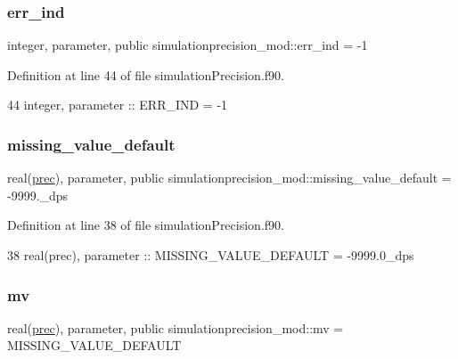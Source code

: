 \subsubsection{\texorpdfstring{err\+\_\+ind}{err\_ind}}
{\footnotesize\ttfamily integer, parameter, public simulationprecision\+\_\+mod\+::err\+\_\+ind = -\/1}



Definition at line 44 of file simulation\+Precision.\+f90.


\begin{DoxyCode}
44     \textcolor{keywordtype}{integer},  \textcolor{keywordtype}{parameter}   :: ERR\_IND  = -1
\end{DoxyCode}
\mbox{\label{namespacesimulationprecision__mod_a8fe62365170cdfed5a745be6d8e99e1c}} 
\subsubsection{\texorpdfstring{missing\+\_\+value\+\_\+default}{missing\_value\_default}}
{\footnotesize\ttfamily real(\mbox{\hyperlink{namespacesimulationprecision__mod_a361ca48174e0dc2228c07f25fa5396ec}{prec}}), parameter, public simulationprecision\+\_\+mod\+::missing\+\_\+value\+\_\+default = -\/9999.\+\_\+dps}



Definition at line 38 of file simulation\+Precision.\+f90.


\begin{DoxyCode}
38     \textcolor{keywordtype}{real(prec)}, \textcolor{keywordtype}{parameter} :: MISSING\_VALUE\_DEFAULT = -9999.0\_dps
\end{DoxyCode}
\mbox{\label{namespacesimulationprecision__mod_aee970e36f3dc8fb77c175ead993257d9}} 
\subsubsection{\texorpdfstring{mv}{mv}}
{\footnotesize\ttfamily real(\mbox{\hyperlink{namespacesimulationprecision__mod_a361ca48174e0dc2228c07f25fa5396ec}{prec}}), parameter, public simulationprecision\+\_\+mod\+::mv = M\+I\+S\+S\+I\+N\+G\+\_\+\+V\+A\+L\+U\+E\+\_\+\+D\+E\+F\+A\+U\+LT}



